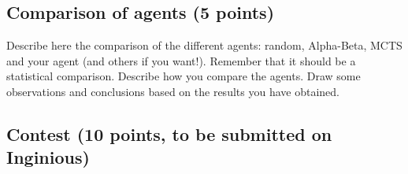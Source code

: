 \documentclass[11pt,a4paper]{report}
\begin{document}
\begin{answers}[23cm]
\end{answers}

\begin{answers}[23cm]
\end{answers}



\newpage
\subsection{Comparison of agents (5 points)}
Describe here the comparison of the different agents: random, Alpha-Beta, MCTS and your agent (and others if you want!). Remember that it should be a statistical comparison. Describe how you compare the agents. Draw some observations and conclusions based on the results you have obtained.

\begin{answers}[20cm]
\end{answers}

\begin{answers}[23cm]
\end{answers}

\begin{answers}[23cm]
\end{answers}


\subsection{Contest (10 points, to be submitted on Inginious)}
\end{document}
